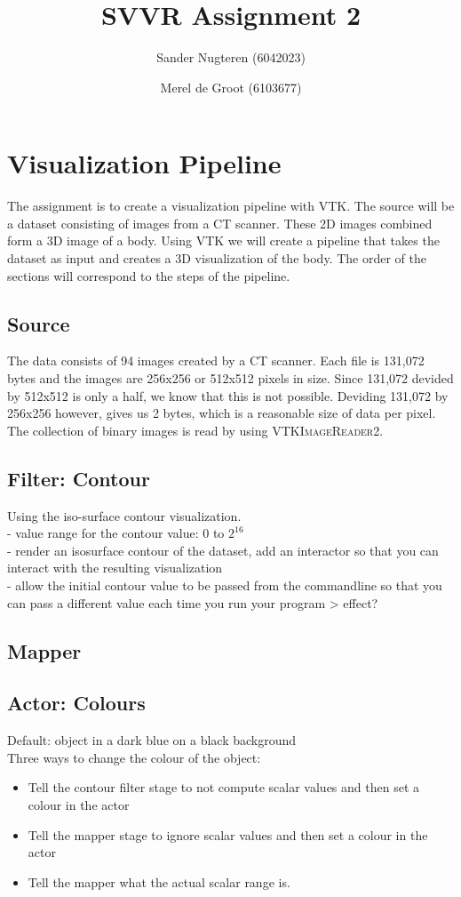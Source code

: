 \documentclass{article}
\begin{document}
\title{SVVR Assignment 2}
\author{Sander Nugteren (6042023) \and Merel de Groot (6103677)}
\renewcommand{\today}{November 17, 2014}
\maketitle

\section{Visualization Pipeline}
The assignment is to create a visualization pipeline with VTK. The source will be a dataset consisting of images from a CT scanner. These 2D images combined form a 3D image of a body. Using VTK we will create a pipeline that takes the dataset as input and creates a 3D visualization of the body. The order of the sections will correspond to the steps of the pipeline.

\subsection{Source}
The data consists of 94 images created by a CT scanner. Each file is 131,072 bytes and the images are 256x256 or 512x512 pixels in size. Since 131,072 devided by 512x512 is only a half, we know that this is not possible. Deviding 131,072 by 256x256 however, gives us 2 bytes, which is a reasonable size of data per pixel. The collection of binary images is read by using \textsc{VTKImageReader2}.

\subsection{Filter: Contour}
Using the iso-surface contour visualization. 
\\ - value range for the contour value: 0 to $2^{16}$
\\ - render an isosurface contour of the dataset, add an interactor so that you can interact with the resulting visualization
\\ - allow the initial contour value to be passed from the commandline so that you can pass a different value each time you run your program > effect?

\subsection{Mapper}

\subsection{Actor: Colours}
Default: object in a dark blue on a black background
\\ Three ways to change the colour of the object:
\begin{itemize}
\item Tell the contour filter stage to not compute scalar values and then set a colour in the actor
\item Tell the mapper stage to ignore scalar values and then set a colour in the actor
\item Tell the mapper what the actual scalar range is. 
\end{itemize}
\end{document}
